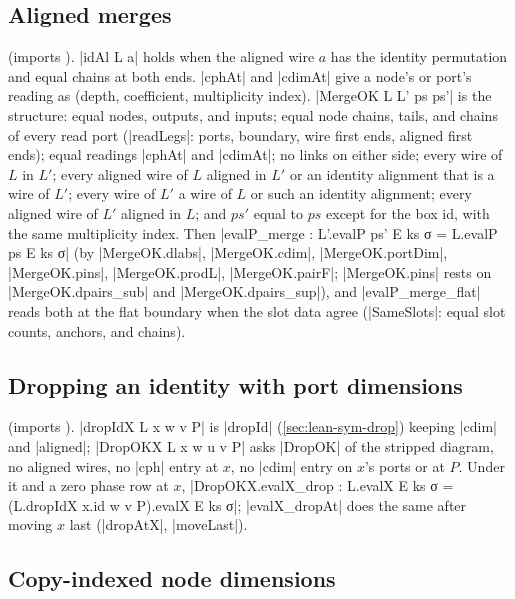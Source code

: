 \subsection{Aligned merges}

 (imports ). \lean|idAl L a| holds when the aligned wire $a$ has the identity permutation and equal chains at both ends. \lean|cphAt| and \lean|cdimAt| give a node's or port's reading as (depth, coefficient, multiplicity index). \lean|MergeOK L L' ps ps'| is the structure: equal nodes, outputs, and inputs; equal node chains, tails, and chains of every read port (\lean|readLegs|: ports, boundary, wire first ends, aligned first ends); equal readings \lean|cphAt| and \lean|cdimAt|; no links on either side; every wire of $L$ in $L'$; every aligned wire of $L$ aligned in $L'$ or an identity alignment that is a wire of $L'$; every wire of $L'$ a wire of $L$ or such an identity alignment; every aligned wire of $L'$ aligned in $L$; and $ps'$ equal to $ps$ except for the box id, with the same multiplicity index. Then \lean|evalP_merge : L'.evalP ps' E ks σ = L.evalP ps E ks σ| (by \lean|MergeOK.dlabs|, \lean|MergeOK.cdim|, \lean|MergeOK.portDim|, \lean|MergeOK.pins|, \lean|MergeOK.prodL|, \lean|MergeOK.pairF|; \lean|MergeOK.pins| rests on \lean|MergeOK.dpairs_sub| and \lean|MergeOK.dpairs_sup|), and \lean|evalP_merge_flat| reads both at the flat boundary when the slot data agree (\lean|SameSlots|: equal slot counts, anchors, and chains).

\subsection{Dropping an identity with port dimensions}

 (imports ). \lean|dropIdX L x w v P| is \lean|dropId| (\cref{sec:lean-sym-drop}) keeping \lean|cdim| and \lean|aligned|; \lean|DropOKX L x w u v P| asks \lean|DropOK| of the stripped diagram, no aligned wires, no \lean|cph| entry at $x$, no \lean|cdim| entry on $x$'s ports or at $P$. Under it and a zero phase row at $x$, \lean|DropOKX.evalX_drop : L.evalX E ks σ = (L.dropIdX x.id w v P).evalX E ks σ|; \lean|evalX_dropAt| does the same after moving $x$ last (\lean|dropAtX|, \lean|moveLast|).

\subsection{Copy-indexed node dimensions}


